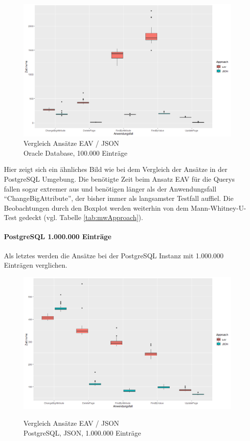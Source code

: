 \begin{figure}[H]
\centering
\includegraphics[scale=0.5]{rStudioPictures/oracle100k1100700.png}
\caption{Vergleich Ansätze EAV / JSON \\ Oracle Database, 100.000 Einträge}
\label{fig:ApproachOracle}
\end{figure}

Hier zeigt sich ein ähnliches Bild wie bei dem Vergleich der Ansätze in der PostgreSQL Umgebung. Die benötigte Zeit beim Ansatz EAV für die Querys fallen sogar extremer aus und benötigen länger als der Anwendungsfall ``ChangeBigAttribute'', der bisher immer als langsamster Testfall auffiel. Die Beobachtungen durch den Boxplot werden weiterhin von dem Mann-Whitney-U-Test gedeckt (vgl. Tabelle \ref{tab:mwApproach}).

\paragraph{PostgreSQL 1.000.000 Einträge}

Als letztes werden die Ansätze bei der PostgreSQL Instanz mit 1.000.000 Einträgen verglichen.

\begin{figure}[H]
\centering
\includegraphics[scale=0.5]{rStudioPictures/postgres1mIndex.png}
\label{fig:ApproachPostgres1m}
\caption{Vergleich Ansätze EAV / JSON \\ PostgreSQL, JSON, 1.000.000 Einträge}
\end{figure}

